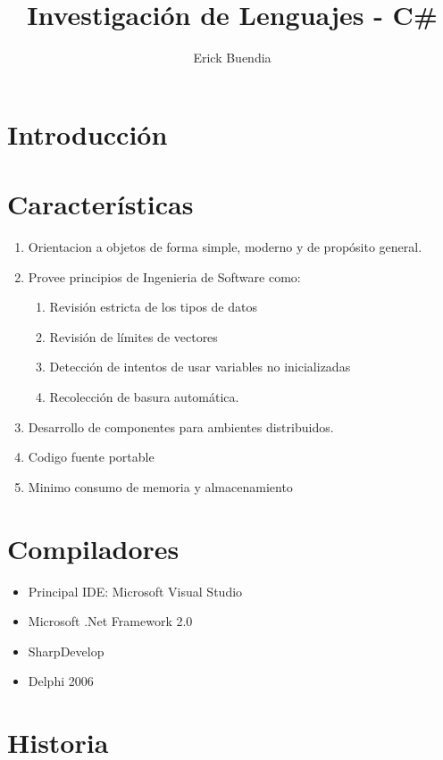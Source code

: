 \documentclass[11pt]{article} %
\title{Investigación de Lenguajes - C\#}
\author{Erick Buendia}
\begin{document}
\maketitle

\section{Introducción}


\section{Características}

 \begin{enumerate}
 \item Orientacion a objetos de forma simple, moderno y de propósito general.
 \item Provee principios de Ingenieria de Software como:
	\begin{enumerate}
 		\item Revisión estricta de los tipos de datos
 		\item Revisión de límites de vectores
		\item Detección de intentos de usar variables no inicializadas
		\item Recolección de basura automática.
	 \end{enumerate}
\item Desarrollo de componentes para ambientes distribuidos.
\item Codigo fuente portable
\item Minimo consumo de memoria y almacenamiento
\end{enumerate} 

\section{Compiladores}

\begin{itemize}
 \item Principal IDE:  Microsoft Visual Studio
 \item Microsoft .Net Framework 2.0
 \item SharpDevelop
 \item Delphi 2006
\end{itemize} 

\section{Historia}
\end{document}
